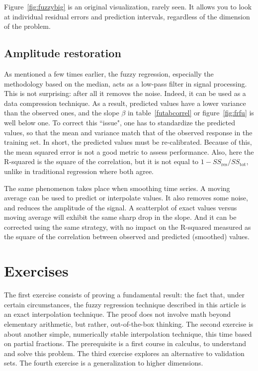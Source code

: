 \documentclass[oneside,10pt]{book}
\begin{document}
Figure~\ref{fig:fuzzybig} is an original visualization, rarely seen. It allows you to look at individual residual errors and prediction intervals, regardless of the dimension of the problem.


\subsection{Amplitude restoration}\label{fpe1stt}

As mentioned a few times earlier, the fuzzy regression, especially the methodology based on the median, acts as a low-pass filter in signal processing. This is not surprising: after all it removes the noise. Indeed, it can be used as a data compression technique. As a result, predicted values have a lower variance than the observed ones, and the slope $\beta$ in table~\ref{futabcorrel} or figure~\ref{fig:frfu} is well below one. To correct this ``issue", one has to standardize the predicted values, so that the mean and variance match that of the observed response in the training set. In short, the predicted values must be re-calibrated. Because of this, the mean squared error is not a good metric to assess performance. Also, here the  R-squared is 
the square of the correlation, but it is not equal to $1- SS_{\text{res}}/SS_{\text{tot}}$, unlike in traditional regression where both agree.

The same phenomenon takes place when smoothing time series. A moving average can be used to predict or interpolate values. It also removes some noise, and reduces the amplitude of the signal. A scatterplot of exact values versus moving average will exhibit the same sharp drop in the slope. And it can be corrected using the same strategy, with no impact on the R-squared measured as the square of the correlation between observed and predicted (smoothed) values. 



\section{Exercises}

The first exercise consists of proving a fundamental result: the fact that, under certain circumstances,  the fuzzy regression technique described in this article is an exact interpolation
technique. The proof does not involve math beyond elementary arithmetic, but rather, out-of-the-box thinking. The second exercise is about another simple, numerically stable interpolation technique, this time based on partial fractions. The prerequisite is a first course in calculus, to understand and solve this problem. The third exercise explores an alternative to validation sets. The fourth exercise is a generalization to higher dimensions.
\end{document}
